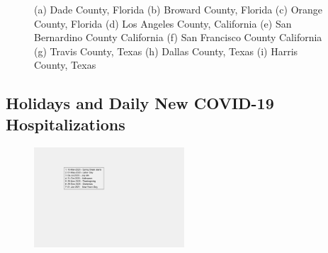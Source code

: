 \documentclass[]{article}
\begin{document}
\begin{figure}
	\caption{(a) Dade County, Florida (b) Broward County, Florida (c) Orange County, Florida (d) Los Angeles County, California (e) San Bernardino County California (f) San Francisco County California (g) Travis County, Texas (h) Dallas County, Texas (i) Harris County, Texas}
	\label{fig:foobar}
\end{figure}

\FloatBarrier
\vspace{5mm}

\subsection{Holidays and Daily New COVID-19 Hospitalizations}

\begin{figure}[!h]
	\centering
	\includegraphics[width=0.50\textwidth]{legends/holiday_legend.png}
	\caption{}
	\label{fig:legends/holiday_legendLabel}
\end{figure}
\end{document}
